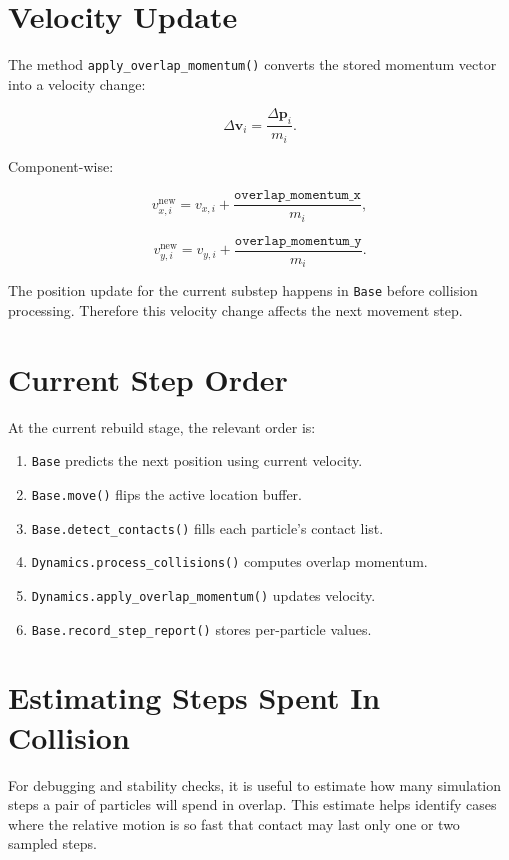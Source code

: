 \documentclass[11pt]{article}
\begin{document}
\section{Velocity Update}

The method \texttt{apply\_overlap\_momentum()} converts the stored momentum
vector into a velocity change:

\[
    \Delta \mathbf{v}_i
    =
    \frac{\Delta \mathbf{p}_i}{m_i}.
\]

Component-wise:

\[
    v_{x,i}^{\text{new}}
    =
    v_{x,i}
    +
    \frac{\texttt{overlap\_momentum\_x}}{m_i},
\]

\[
    v_{y,i}^{\text{new}}
    =
    v_{y,i}
    +
    \frac{\texttt{overlap\_momentum\_y}}{m_i}.
\]

The position update for the current substep happens in \texttt{Base} before
collision processing. Therefore this velocity change affects the next movement
step.

\section{Current Step Order}

At the current rebuild stage, the relevant order is:

\begin{enumerate}
    \item \texttt{Base} predicts the next position using current velocity.
    \item \texttt{Base.move()} flips the active location buffer.
    \item \texttt{Base.detect\_contacts()} fills each particle's contact list.
    \item \texttt{Dynamics.process\_collisions()} computes overlap momentum.
    \item \texttt{Dynamics.apply\_overlap\_momentum()} updates velocity.
    \item \texttt{Base.record\_step\_report()} stores per-particle values.
\end{enumerate}

\section{Estimating Steps Spent In Collision}

For debugging and stability checks, it is useful to estimate how many simulation
steps a pair of particles will spend in overlap. This estimate helps identify
cases where the relative motion is so fast that contact may last only one or
two sampled steps.
\end{document}
